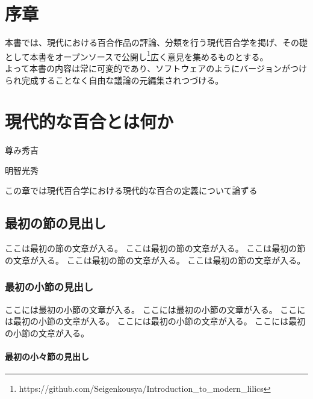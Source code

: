 \documentclass[ %
	uplatex,%
	a5paper,%
	papersize%
	]{jsbook}
\begin{document}
						\pagecolor{white}
						\color{black}
						\frontmatter

						\chapter{序章}

						本書では、現代における百合作品の評論、分類を行う現代百合学を掲げ、その礎として本書をオープンソースで公開し\footnote{https://github.com/Seigenkousya/Introduction\_to\_modern\_lilics}広く意見を集めるものとする。\\
						よって本書の内容は常に可変的であり、ソフトウェアのようにバージョンがつけられ完成することなく自由な議論の元編集されつづける。

						\tableofcontents %

						\mainmatter

						\chapter{現代的な百合とは何か}

						\epigraph{尊み秀吉}{明智光秀}

						\begin{summary}
							この章では現代百合学における現代的な百合の定義について論ずる
						\end{summary}

						\section{最初の節の見出し}

						ここは最初の節の文章が入る。
						ここは最初の節の文章が入る。
						ここは最初の節の文章が入る。
						ここは最初の節の文章が入る。
						ここは最初の節の文章が入る。

						\subsection{最初の小節の見出し}

						ここには最初の小節の文章が入る。
						ここには最初の小節の文章が入る。
						ここには最初の小節の文章が入る。
						ここには最初の小節の文章が入る。
						ここには最初の小節の文章が入る。

						\subsubsection{最初の小々節の見出し}
\end{document}
